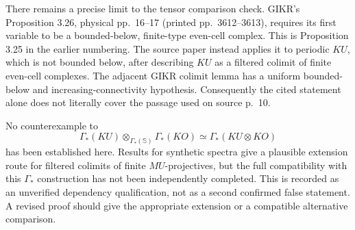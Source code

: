 \documentclass[10pt]{article}
\begin{document}
There remains a precise limit to the tensor comparison check. GIKR’s Proposition 3.26, physical pp. 16–17 (printed pp. 3612–3613), requires its first variable to be a bounded-below, finite-type even-cell complex. This is Proposition 3.25 in the earlier numbering. The source paper instead applies it to periodic \(KU\), which is not bounded below, after describing \(KU\) as a filtered colimit of finite even-cell complexes. The adjacent GIKR colimit lemma has a uniform bounded-below and increasing-connectivity hypothesis. Consequently the cited statement alone does not literally cover the passage used on source p. 10.\par
No counterexample to \[\Gamma_*(KU)\otimes_{\Gamma_*(\mathbb S)}\Gamma_*(KO)
       \simeq\Gamma_*(KU\otimes KO)\] has been established here. Results for synthetic spectra give a plausible extension route for filtered colimits of finite \(MU\)-projectives, but the full compatibility with this \(\Gamma_*\) construction has not been independently completed. This is recorded as an unverified dependency qualification, not as a second confirmed false statement. A revised proof should give the appropriate extension or a compatible alternative comparison.\par
\end{document}
